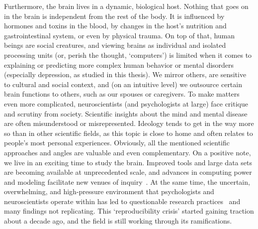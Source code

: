 %
Furthermore, the brain lives in a dynamic, biological host.
Nothing that goes on in the brain is independent from the rest of the body.
It is influenced by hormones and toxins in the blood, by changes in the host's nutrition and gastrointestinal system, or even by physical trauma.
On top of that, human beings are social creatures, and viewing brains as individual and isolated processing units (or, perish the thought, `computers') is limited when it comes to explaining or predicting more complex human behavior or mental disorders (especially depression, as studied in this thesis).
We mirror others, are sensitive to cultural and social context, and (on an intuitive level) we outsource certain brain functions to others, such as our spouses or caregivers.
%
To make matters even more complicated, neuroscientists (and psychologists at large) face critique and scrutiny from society.
Scientific insights about the mind and mental disease are often misunderstood or misrepresented.
Ideology tends to get in the way more so than in other scientific fields, as this topic is close to home and often relates to people's most personal experiences.
%
Obviously, all the mentioned scientific approaches and angles are valuable and even complementary.
On a positive note, we live in an exciting time to study the brain.
Improved tools and large data sets are becoming available at unprecedented scale, and advances in computing power and modeling facilitate new venues of inquiry~\parencite{Griffiths2015, Bzdok2017, Rutledge2019, Guest2021}.
%
At the same time, the uncertain, overwhelming, and high-pressure environment that psychologists and neuroscientists operate within has led to questionable research practices~\parencite{John2012} and many findings not replicating.
This `reproducibility crisis' started gaining traction about a decade ago, and the field is still working through its ramifications.

